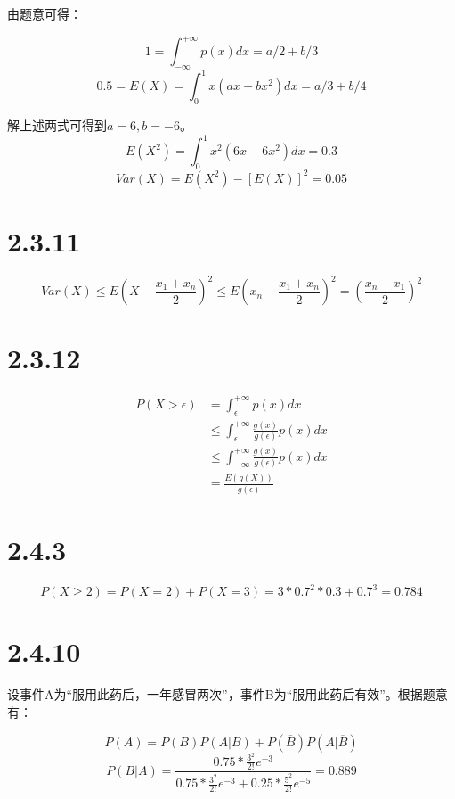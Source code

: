\documentclass{article}
\begin{document}
由题意可得：

$$1=\int_{-\infty}^{+\infty}p(x)dx=a/2+b/3$$
$$0.5=E(X)=\int_0^1x(ax+bx^2)dx=a/3+b/4$$

解上述两式可得到$a=6,b=-6$。
$$E(X^2)=\int^1_0x^2(6x-6x^2)dx=0.3$$
$$Var(X)=E(X^2)-[E(X)]^2=0.05$$

\section{2.3.11}



$$Var(X)\leq E(X-\frac{x_1+x_n}{2})^2\leq E(x_n-\frac{x_1+x_n}{2})^2=(\frac{x_n-x_1}{2})^2$$


\section{2.3.12}

\begin{equation}
\begin{aligned}
P(X>\epsilon)&=\int_\epsilon^{+\infty}p(x)dx\\
&\leq\int_\epsilon^{+\infty}\frac{g(x)}{g(\epsilon)}p(x)dx\\
&\leq\int_{-\infty}^{+\infty}\frac{g(x)}{g(\epsilon)}p(x)dx\\
&=\frac{E(g(X))}{g(\epsilon)}
\end{aligned}
\end{equation}

\section{2.4.3}
$$P(X\geq2)=P(X=2)+P(X=3)=3*0.7^2*0.3+0.7^3=0.784$$

\section{2.4.10}
设事件A为“服用此药后，一年感冒两次”，事件B为“服用此药后有效”。根据题意有：

$$P(A)=P(B)P(A|B)+P(\overline B)P(A|\overline B)$$
$$P(B|A)=\frac{0.75*\frac{3^2}{2!}e^{-3}}{0.75*\frac{3^2}{2!}e^{-3}+0.25*\frac{5^2}{2!}e^{-5}}=0.889$$
\end{document}
